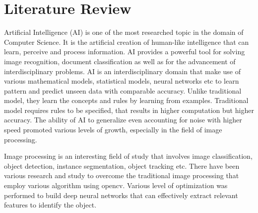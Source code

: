 \chapter{Literature Review} 
Artificial Intelligence (AI) is one of the most researched topic in the domain of Computer Science. It is the artificial creation of human-like intelligence that can learn, perceive and process information. AI provides a powerful tool for solving image recognition, document classification as well as for the advancement of interdisciplinary problems. AI is an interdisciplinary domain that make use of various mathematical models, statistical models, neural networks etc to learn pattern and predict unseen data with comparable accuracy. Unlike traditional model, they learn the concepts and rules by learning from examples. Traditional model requires rules to be specified, that results in higher computation but higher accuracy. The ability of AI to generalize even accounting for noise with higher speed promoted various levels of growth, especially in the field of image processing.

Image processing is an interesting field of study that involves image classification, object detection, instance segmentation, object tracking etc. There have been various research and study to overcome the traditional image processing that employ various algorithm using opencv. Various level of optimization was performed to build deep neural networks that can effectively extract relevant features to identify the object.

